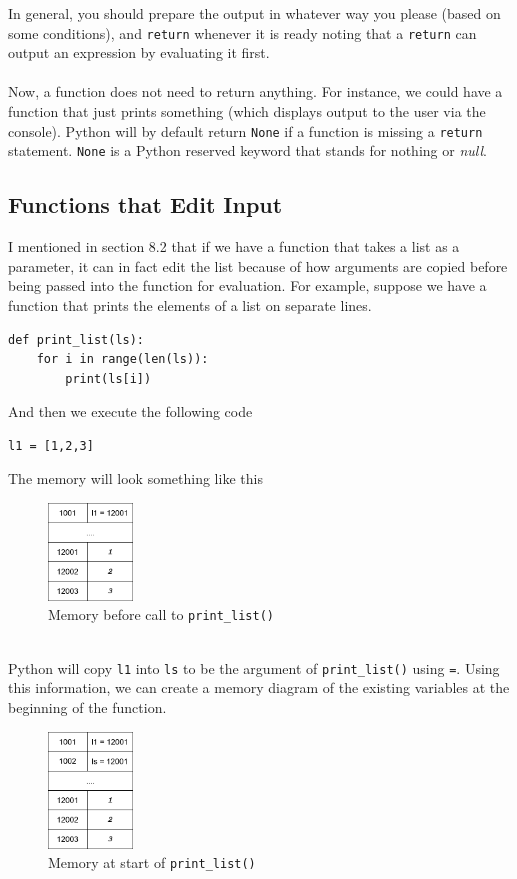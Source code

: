 \documentclass{article}
\begin{document}
In general, you should prepare the output in whatever way you please (based on some conditions), and \texttt{return} whenever it is ready noting that a \texttt{return} can output an expression by evaluating it first.\\\\
Now, a function does not need to return anything. For instance, we could have a function that just prints something (which displays output to the user via the console). Python will by default return \texttt{None} if a function is missing a \texttt{return} statement. \texttt{None} is a Python reserved keyword that stands for nothing or \textit{null}.

\subsection{Functions that Edit Input}
I mentioned in section 8.2 that if we have a function that takes a list as a parameter, it can in fact edit the list because of how arguments are copied before being passed into the function for evaluation. For example, suppose we have a function that prints the elements of a list on separate lines.
\begin{verbatim}
def print_list(ls):
    for i in range(len(ls)):
        print(ls[i])
\end{verbatim}
And then we execute the following code
\begin{verbatim}
l1 = [1,2,3]
\end{verbatim}
The memory will look something like this
\begin{figure}[hbt]
    \centering
    \includegraphics[width=0.2\textwidth]{pointer_diagram_66.png}
    \caption{Memory before call to \texttt{print\_list()}}
    \label{fig:my_label}
\end{figure}\\
Python will copy \texttt{l1} into \texttt{ls} to be the argument of \texttt{print\_list()} using \texttt{=}. Using this information, we can create a memory diagram of the existing variables at the beginning of the function.
\begin{figure}[hbt]
    \centering
    \includegraphics[width=0.2\textwidth]{pointer_diagram_7.png}
    \caption{Memory at start of \texttt{print\_list()}}
    \label{fig:my_label}
\end{figure}\\
\end{document}
